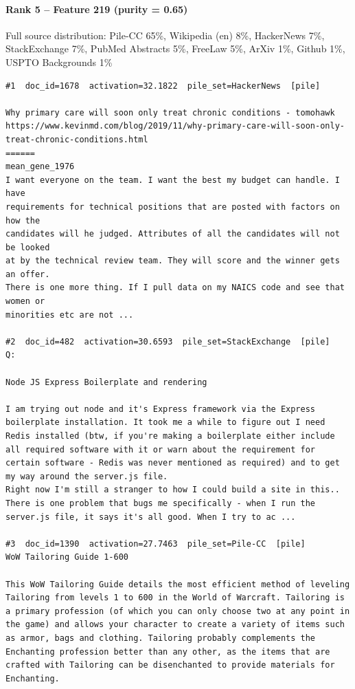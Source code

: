 \paragraph*{Rank 5 -- Feature 219 (purity = 0.65)}

Full source distribution: Pile-CC 65\%, Wikipedia (en) 8\%, HackerNews 7\%, StackExchange 7\%, PubMed Abstracts 5\%, FreeLaw 5\%, ArXiv 1\%, Github 1\%, USPTO Backgrounds 1\%

\begin{verbatim}
#1  doc_id=1678  activation=32.1822  pile_set=HackerNews  [pile]

Why primary care will soon only treat chronic conditions - tomohawk
https://www.kevinmd.com/blog/2019/11/why-primary-care-will-soon-only-treat-chronic-conditions.html
======
mean_gene_1976
I want everyone on the team. I want the best my budget can handle. I have
requirements for technical positions that are posted with factors on how the
candidates will he judged. Attributes of all the candidates will not be looked
at by the technical review team. They will score and the winner gets an offer.
There is one more thing. If I pull data on my NAICS code and see that women or
minorities etc are not ...

#2  doc_id=482  activation=30.6593  pile_set=StackExchange  [pile]
Q:

Node JS Express Boilerplate and rendering

I am trying out node and it's Express framework via the Express boilerplate installation. It took me a while to figure out I need Redis installed (btw, if you're making a boilerplate either include all required software with it or warn about the requirement for certain software - Redis was never mentioned as required) and to get my way around the server.js file.
Right now I'm still a stranger to how I could build a site in this..
There is one problem that bugs me specifically - when I run the server.js file, it says it's all good. When I try to ac ...

#3  doc_id=1390  activation=27.7463  pile_set=Pile-CC  [pile]
WoW Tailoring Guide 1-600

This WoW Tailoring Guide details the most efficient method of leveling Tailoring from levels 1 to 600 in the World of Warcraft. Tailoring is a primary profession (of which you can only choose two at any point in the game) and allows your character to create a variety of items such as armor, bags and clothing. Tailoring probably complements the Enchanting profession better than any other, as the items that are crafted with Tailoring can be disenchanted to provide materials for Enchanting.


\end{verbatim}
